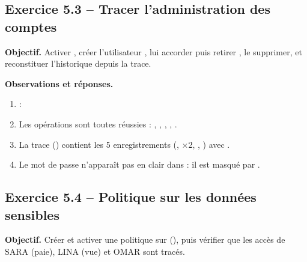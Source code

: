 \subsection{Exercice 5.3 -- Tracer l'administration des comptes}
\textbf{Objectif.} Activer , créer l'utilisateur , lui accorder puis retirer
, le supprimer, et reconstituer l'historique depuis la trace.


\textbf{Observations et réponses.}
\begin{enumerate}
  \item {} : 
  \item Les opérations sont toutes réussies : , ,
        , , .
  \item La trace  () contient les 5
        enregistrements (,  ×2, , ) avec .
  \item Le mot de passe n'apparaît pas en clair dans  : il est masqué par
        .
\end{enumerate}

\subsection{Exercice 5.4 -- Politique sur les données sensibles}
\textbf{Objectif.} Créer et activer une politique  sur  (),
puis vérifier que les accès de SARA (paie), LINA (vue) et OMAR sont tracés.


